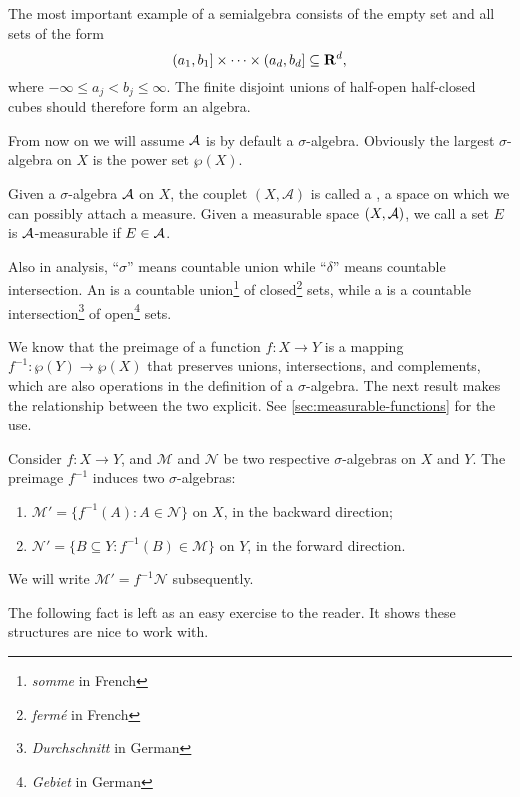 The most important example of a semialgebra consists of the empty set and all sets of the form \[
    (a_1,b_1] \times \dotsb \times (a_d,b_d] \subseteq \mathbf{R}^d,
\] where $-\infty \leq a_j<b_j \leq \infty$. The finite disjoint unions of half-open half-closed cubes should therefore form an algebra.

From now on we will assume $\mathcal{A}$ is by default a $\sigma$-algebra. Obviously the largest $\sigma$-algebra on $X$ is the power set $\wp(X)$.

Given a $\sigma$-algebra $\mathcal{A}$ on $X$, the couplet $(X,\mathcal{A})$ is called a , a space on which we can possibly attach a measure. Given a measurable space $(X,\mathcal{A})$, we call a set $E$ is $\mathcal{A}$-measurable if $E\in \mathcal{A}$.

Also in analysis, ``$\sigma$'' means countable union while ``$\delta$'' means countable intersection. An  is a countable union\footnote{\emph{somme} in French} of closed\footnote{\emph{fermé} in French} sets, while a  is a countable intersection\footnote{\emph{Durchschnitt} in German} of open\footnote{\emph{Gebiet} in German} sets.

We know that the preimage of a function $f\colon X \to Y$ is a mapping $f^{-1}\colon \wp(Y) \to \wp(X)$ that preserves unions, intersections, and complements, which are also operations in the definition of a $\sigma$-algebra. The next result makes the relationship between the two explicit. See \cref{sec:measurable-functions} for the use.
\begin{prop} \label{prop:induce-s-alg-meas-map}
    Consider $f\colon X \to Y$, and $\mathcal{M}$ and $\mathcal{N}$ be two respective $\sigma$-algebras on $X$ and $Y$. The preimage $f^{-1}$ induces two $\sigma$-algebras: \begin{enumerate}
        \item \label{enu:backward-ind-s-alg} $\mathcal{M}' =\{f^{-1}(A) : A \in \mathcal{N}\}$ on $X$, in the backward direction; 
        \item \label{enu:forward-ind-s-alg} $\mathcal{N}' = \{B \subseteq Y : f^{-1}(B) \in \mathcal{M}\}$ on $Y$, in the forward direction.
    \end{enumerate}
\end{prop}
We will write $\mathcal M' = f^{-1}\mathcal N$ subsequently.

The following fact is left as an easy exercise to the reader. It shows these structures are nice to work with.

